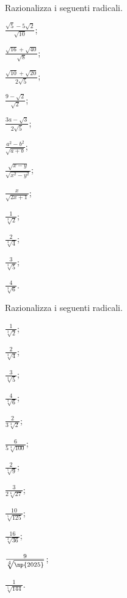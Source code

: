 \begin{esercizio}[\Ast]
 \label{ese:2.88}
Razionalizza i seguenti radicali.
 \begin{multicols}{4}
 \begin{enumeratea}
 \item $\frac{\sqrt 5-5\sqrt 2}{\sqrt{10}}$;
 \item $\frac{\sqrt{16}+\sqrt{40}}{\sqrt 8}$;
 \item $\frac{\sqrt{10}+\sqrt{20}}{2\sqrt 5}$;
 \item $\frac{9-\sqrt 2}{\sqrt 2}$;
 \item $\frac{3a-\sqrt 3}{2\sqrt 5}$;
 \item $\frac{a^2-b^2}{\sqrt{a+b}}$;
 \item $\frac{\sqrt{x-y}}{\sqrt{x^2-y^2}}$;
 \item $\frac x{\sqrt{2x+1}}$;
 \item $\frac 1{\sqrt[3]2}$;
 \item $\frac 2{\sqrt[3]4}$;
 \item $\frac 3{\sqrt[3]5}$;
 \item $\frac 4{\sqrt[3]6}$.
 \end{enumeratea}
 \end{multicols}
\end{esercizio}

\begin{esercizio}[\Ast]
 \label{ese:2.89}
Razionalizza i seguenti radicali.
 \begin{multicols}{4}
 \begin{enumeratea}
 \item $\frac 1{\sqrt[3]2}$;
 \item $\frac 2{\sqrt[3]4}$;
 \item $\frac 3{\sqrt[3]5}$;
 \item $\frac 4{\sqrt[3]6}$;
 \item $\frac 2{3\sqrt[3]2}$;
 \item $\frac 6{5\sqrt[3]{100}}$;
 \item $\frac 2{\sqrt[5]9}$;
 \item $\frac 3{2\sqrt[6]{27}}$;
 \item $\frac{10}{\sqrt[5]{125}}$;
 \item $\frac{16}{\sqrt[3]{36}}$;
 \item $\frac 9{\sqrt[4]{\np{2025}}}$;
 \item $\frac 1{\sqrt[5]{144}}$.
 \end{enumeratea}
 \end{multicols}
\end{esercizio}

